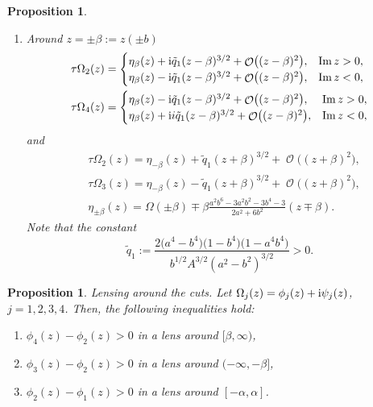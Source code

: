 \documentclass[pdftex]{sigma}
\DeclareMathOperator{\OO}{\mathcal{O}}
\numberwithin{equation}{section}
\newtheorem{Proposition}[Theorem]{Proposition}
 { \theoremstyle{definition}
\newtheorem{Definition}[Theorem]{Definition}
\newtheorem{Note}[Theorem]{Note}
\newtheorem{Example}[Theorem]{Example}
\newtheorem{Remark}[Theorem]{Remark} }
\begin{document}
\begin{Proposition}
\begin{enumerate}
 \item[$(2)$] \textit{Around $z = \pm\beta := z(\pm b)$}
 \begin{align*}
 &\tau\Omega_2(z)=
 \begin{cases}
 \eta_{\beta}(z) + {\rm i}\tilde{q}_1 (z -\beta)^{3/2} + \OO\bigl( (z-\beta)^2 \bigr), & \operatorname{Im} z > 0,\\
 \eta_{\beta}(z) - {\rm i}\tilde{q}_1(z -\beta)^{3/2} + \OO\bigl( (z-\beta)^2 \bigr),& \operatorname{Im} z < 0,\\
 \end{cases}\\
 &\tau\Omega_4(z)=
 \begin{cases}
 \eta_{\beta}(z) - {\rm i}\tilde{q}_1 (z -\beta)^{3/2} + \OO\bigl( (z-\beta)^2 \bigr), & \operatorname{Im} z > 0,\\
 \eta_{\beta}(z) + {\rm i}i\tilde{q}_1 (z -\beta)^{3/2} + \OO\bigl( (z-\beta)^2 \bigr),& \operatorname{Im} z < 0,\\
 \end{cases}
 \end{align*}
 and
 \begin{align*}
 &\tau\Omega_2(z)= \eta_{-\beta}(z) + \tilde{q}_1 (z +\beta)^{3/2} + \OO\bigl( (z+\beta)^2 \bigr),\\
 &\tau\Omega_3(z)= \eta_{-\beta}(z) - \tilde{q}_1 (z +\beta)^{3/2} + \OO\bigl( (z+\beta)^2 \bigr),\\
& \eta_{ \pm \beta}(z) = \Omega(\pm \beta) \mp \beta \frac{a^2b^6 - 3a^2b^2 - 3b^4 - 3}{2a^2 + 6b^2} (z\mp \beta).
 \end{align*}
Note that the constant
 \[
 \tilde{q}_1 := \frac{2 \bigl(a^4-b^4\bigr)\bigl(1-b^4\bigr)\bigl(1-a^4b^4\bigr)}{b^{1/2}A^{3/2} (a^2-b^2)^{3/2}} >0.
 \]
 \end{enumerate}
\end{Proposition}


 \begin{Proposition}\label{lensing-generic}
 \textit{Lensing around the cuts.}
 Let $\Omega_j(z) = \phi_j(z) + {\rm i}\psi_j(z)$, $j= 1,2,3,4$. Then, the following inequalities hold:
 \begin{enumerate}\itemsep=0pt
 \item[$(1)$] $\phi_4(z) - \phi_2(z) > 0$ in a lens around $[\beta,\infty)$,
 \item[$(2)$] $\phi_3(z) - \phi_2(z) > 0$ in a lens around $(-\infty,-\beta]$,
 \item[$(3)$] $\phi_2(z) - \phi_1(z) > 0$ in a lens around $[-\alpha,\alpha]$.
 \end{enumerate}
 \end{Proposition}
\end{document}
